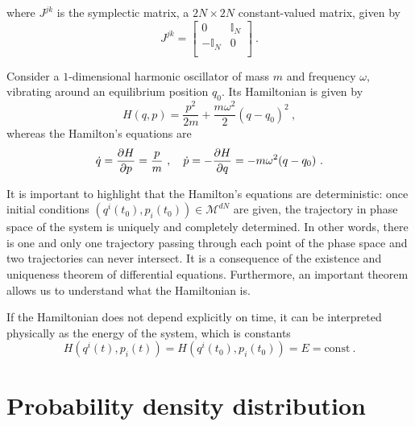     where $J^{jk}$ is the symplectic matrix, a $2N \times 2N$ constant-valued matrix, given by
    \begin{equation*}
        J^{jk} = \begin{bmatrix}
            0 & \mathbb I_N \\
            -\mathbb I_N & 0 \\
        \end{bmatrix} ~.
    \end{equation*}
    \begin{example}
        Consider a $1$-dimensional harmonic oscillator of mass $m$ and frequency $\omega$, vibrating around an equilibrium position $q_0$. Its Hamiltonian is given by
        \begin{equation*}
            H (q, p) = \frac{p^2}{2m} + \frac{m \omega^2}{2} (q - q_0)^2 ~,
        \end{equation*}
        whereas the Hamilton's equations are
        \begin{equation*}
            \dot q = \frac{\partial H}{\partial p} = \frac{p}{m} ~, \quad \dot p = - \frac{\partial H}{\partial q} = - m \omega^2 (q - q_0) ~.
        \end{equation*}
    \end{example}
    It is important to highlight that the Hamilton's equations are deterministic: once initial conditions $(q^i(t_0), p_i(t_0)) \in \mathcal M^{dN}$ are given, the trajectory in phase space of the system is uniquely and completely determined. In other words, there is one and only one trajectory passing through each point of the phase space and two trajectories can never intersect. It is a consequence of the existence and uniqueness theorem of differential equations. Furthermore, an important theorem allows us to understand what the Hamiltonian is.

    \begin{theorem}\label{cm:consen}
        If the Hamiltonian does not depend explicitly on time, it can be interpreted physically as the energy of the system, which is constants
        \begin{equation*}
            H(q^i(t), p_i(t)) = H(q^i(t_0), p_i(t_0)) = E = \text{const} ~.
        \end{equation*}
    \end{theorem}

\section{Probability density distribution}

